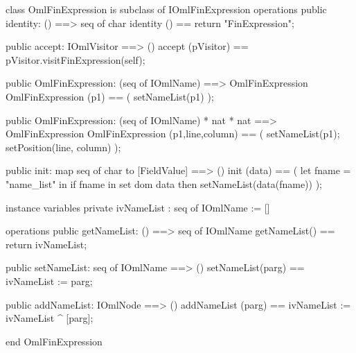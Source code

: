 \begin{vdm_al}
class OmlFinExpression is subclass of IOmlFinExpression
operations
  public identity: () ==> seq of char
  identity () == return "FinExpression";

  public accept: IOmlVisitor ==> ()
  accept (pVisitor) == pVisitor.visitFinExpression(self);

  public OmlFinExpression:
    (seq of IOmlName) ==> OmlFinExpression
  OmlFinExpression (p1) == 
    ( setNameList(p1) );

  public OmlFinExpression:
    (seq of IOmlName) *
    nat *
    nat ==> OmlFinExpression
  OmlFinExpression (p1,line,column) == 
    ( setNameList(p1);
      setPosition(line, column) );

  public init: map seq of char to [FieldValue] ==> ()
  init (data) ==
    ( let fname = "name_list" in
        if fname in set dom data
        then setNameList(data(fname)) );

instance variables
  private ivNameList : seq of IOmlName := []

operations
  public getNameList: () ==> seq of IOmlName
  getNameList() == return ivNameList;

  public setNameList: seq of IOmlName ==> ()
  setNameList(parg) == ivNameList := parg;

  public addNameList: IOmlNode ==> ()
  addNameList (parg) == ivNameList := ivNameList ^ [parg];

end OmlFinExpression
\end{vdm_al}


